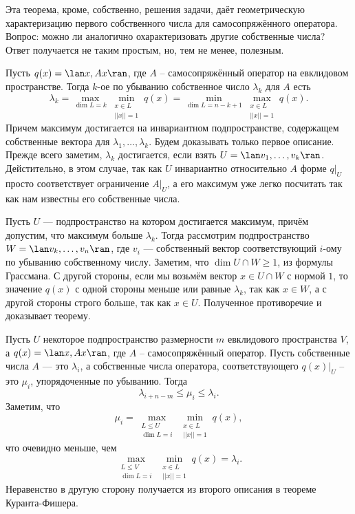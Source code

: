 Эта теорема, кроме, собственно, решения задачи, даёт геометрическую характеризацию первого собственного числа для самосопряжённого оператора. Вопрос: можно ли аналогично охарактеризовать другие собственные числа? Ответ получается не таким простым, но, тем не менее, полезным.

 Пусть $q(x)=\lan x, Ax\ran$, где $A$ -- самосопряжённый оператор на евклидовом пространстве. Тогда $k$-ое по убыванию собственное число $\lambda_k$ для $A$ есть 
$$\lambda_k=\max_{\dim L=k} \min_{\substack{ x\in L \\ ||x||=1}} q(x) = \min_{\dim L=n-k+1} \max_{\substack{ x\in L \\ ||x||=1}} q(x).$$
Причем максимум достигается на инвариантном подпространстве, содержащем собственные вектора для $\lambda_1,\dots,\lambda_k$.
\ethrm
\proof Будем доказывать только первое описание. Прежде всего заметим, $\lambda_k$ достигается, если взять $U=\lan v_1,\dots,v_k\ran$. Дейстительно, в этом случае, так как $U$ инвариантно относительно $A$ форме $q|_U$ просто соответствует ограничение $A|_U$, а его максимум уже легко посчитать так как нам известны его собственные числа.

Пусть $U$ --- подпространство на котором достигается максимум, причём допустим, что максимум больше $\lambda_k$. Тогда рассмотрим подпространство $W=\lan v_k,\dots,v_n\ran$, где $v_i$ --- собственный вектор соответствующий $i$-ому по убыванию собственному числу. Заметим, что $\dim U\cap W\geq 1$, из формулы Грассмана. С другой стороны, если мы возьмём вектор $x\in U \cap W$ с нормой $1$, то значение $q(x)$ с одной стороны меньше или равные $\lambda_k$, так как $x\in W$, а с другой стороны строго больше, так как $x\in U$. Полученное противоречие и доказывает теорему.  
\endproof




\crl Пусть $U$ некоторое подпространство размерности $m$ евклидового пространства $V$, а $q(x)=\lan x, Ax\ran$, где $A$ -- самосопряжённый оператор. Пусть собственные числа $A$ --- это $\lambda_i$, а собственные числа оператора, соответствующего $q(x)|_U$ -- это $\mu_i$, упорядоченные по убыванию. Тогда 
$$\lambda_{i+n-m}\leq \mu_i\leq \lambda_i.$$  
\proof Заметим, что
$$\mu_i=\max_{\substack{L\leq U\\ \dim L=i}} \min_{\substack{ x\in L \\ ||x||=1}} q(x),$$
что очевидно меньше, чем 
$$\max_{\substack{L\leq V\\ \dim L=i}} \min_{\substack{ x\in L \\ ||x||=1}} q(x)=\lambda_i.$$
Неравенство в другую сторону получается из второго описания в теореме Куранта-Фишера.
\endproof
\ecrl

